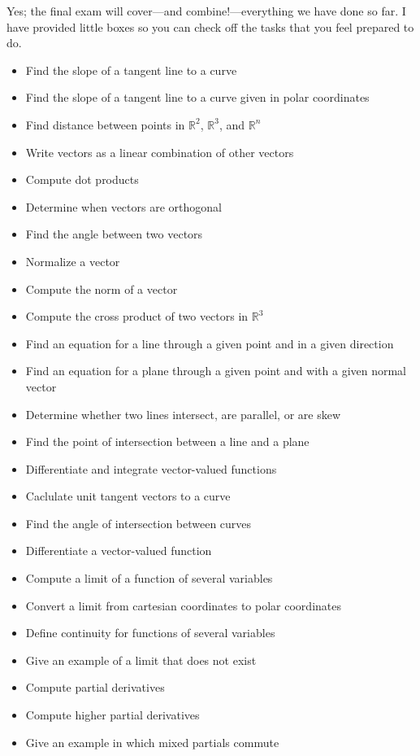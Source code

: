 \documentclass[12pt]{article}
\newcommand{\R}{\mathbb{R}}
\begin{document}
Yes; the final exam will cover---and combine!---everything we have
done so far.  I have provided little boxes so you can check off the tasks that you feel prepared to do.
\begin{multicols}{2}
\begin{itemize}
\item Find the slope of a tangent line to a curve
\item Find the slope of a tangent line to a curve given in polar coordinates
\item Find distance between points in $\R^2$, $\R^3$, and $\R^n$
\item Write vectors as a linear combination of other vectors
\item Compute dot products
\item Determine when vectors are orthogonal
\item Find the angle between two vectors
\item Normalize a vector
\item Compute the norm of a vector
\item Compute the cross product of two vectors in $\R^3$
\item Find an equation for a line through a given point and in a given direction
\item Find an equation for a plane through a given point and with a given normal vector
\item Determine whether two lines intersect, are parallel, or are skew
\item Find the point of intersection between a line and a plane
\item Differentiate and integrate vector-valued functions
\item Caclulate unit tangent vectors to a curve
\item Find the angle of intersection between curves
\item Differentiate a vector-valued function
\item Compute a limit of a function of several variables
\item Convert a limit from cartesian coordinates to polar coordinates
\item Define continuity for functions of several variables
\item Give an example of a limit that does not exist
\item Compute partial derivatives
\item Compute higher partial derivatives
\item Give an example in which mixed partials commute

\end{itemize}
\end{multicols}
\end{document}
